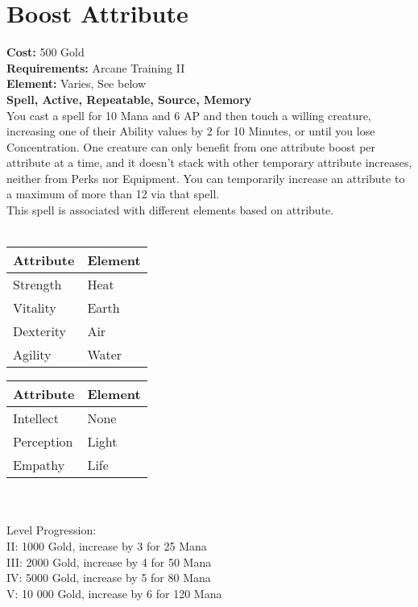 \section{Boost Attribute}
\textbf{Cost:} 500 Gold\\
\textbf{Requirements:} Arcane Training II\\
\textbf{Element:} Varies, See below\\
\textbf{Spell, Active, Repeatable, Source, Memory}\\
You cast a spell for 10 Mana and 6 AP and then touch a willing creature, increasing one of their Ability values by 2 for 10 Minutes, or until you lose Concentration. One creature can only benefit from one attribute boost per attribute at a time, and it doesn’t stack with other temporary attribute increases, neither from Perks nor Equipment. You can temporarily increase an attribute to a maximum of more than 12 via that spell.\\
This spell is associated with different elements based on attribute.\\
\\
\begin{minipage}{0.5\textwidth}
	\begin{tabular}{l | l} 
		Attribute & Element\\ \hline
		Strength & Heat\\
		Vitality & Earth\\
		Dexterity & Air\\
		Agility & Water\\
	\end{tabular}
\end{minipage}
\begin{minipage}{0.5\textwidth}
	\begin{tabular}{l | l}
		Attribute & Element\\ \hline
		Intellect & None\\
		Perception & Light\\
		Empathy & Life\\
	\end{tabular}
\end{minipage}
\\
\\
Level Progression:\\
II: 1000 Gold, increase by 3 for 25 Mana\\
III: 2000 Gold, increase by 4 for 50 Mana\\
IV: 5000 Gold, increase by 5 for 80 Mana\\
V: 10 000 Gold, increase by 6 for 120 Mana\\